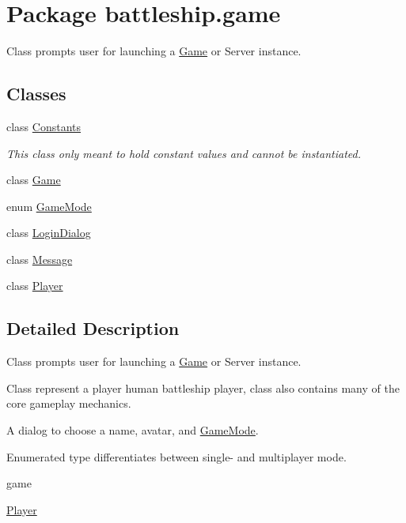 \hypertarget{namespacebattleship_1_1game}{}\section{Package battleship.\+game}
\label{namespacebattleship_1_1game}


Class prompts user for launching a \hyperlink{classbattleship_1_1game_1_1Game}{Game} or Server instance.  


\subsection*{Classes}
\begin{DoxyCompactItemize}
\item 
class \hyperlink{classbattleship_1_1game_1_1Constants}{Constants}
\begin{DoxyCompactList}\small\item\em This class only meant to hold constant values and cannot be instantiated. \end{DoxyCompactList}\item 
class \hyperlink{classbattleship_1_1game_1_1Game}{Game}
\item 
enum \hyperlink{enumbattleship_1_1game_1_1GameMode}{Game\+Mode}
\item 
class \hyperlink{classbattleship_1_1game_1_1LoginDialog}{Login\+Dialog}
\item 
class \hyperlink{classbattleship_1_1game_1_1Message}{Message}
\item 
class \hyperlink{classbattleship_1_1game_1_1Player}{Player}
\end{DoxyCompactItemize}


\subsection{Detailed Description}
Class prompts user for launching a \hyperlink{classbattleship_1_1game_1_1Game}{Game} or Server instance. 

Class represent a player human battleship player, class also contains many of the core gameplay mechanics.

A dialog to choose a name, avatar, and \hyperlink{enumbattleship_1_1game_1_1GameMode}{Game\+Mode}.

Enumerated type differentiates between single-\/ and multiplayer mode.

game

\hyperlink{classbattleship_1_1game_1_1Player}{Player} 